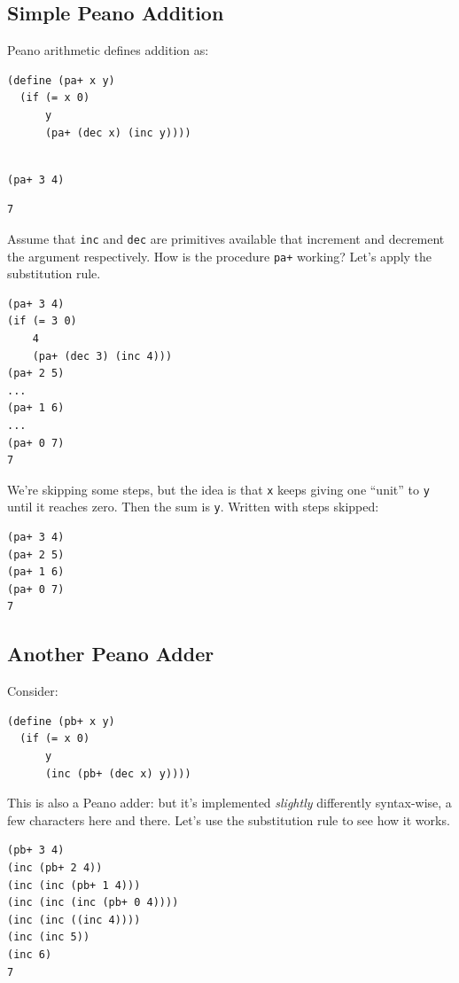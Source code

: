 \documentclass[9pt]{report}
\begin{document}
\subsection{Simple Peano Addition}
\label{sec:orgf3413b8}
Peano arithmetic defines addition as:

\begin{verbatim}
(define (pa+ x y)
  (if (= x 0)
      y
      (pa+ (dec x) (inc y))))
\end{verbatim}

\begin{verbatim}

(pa+ 3 4)
\end{verbatim}

\begin{verbatim}
7
\end{verbatim}


Assume that \texttt{inc} and \texttt{dec} are primitives available that increment
and decrement the argument respectively. How is the procedure \texttt{pa+}
working? Let's apply the substitution rule.

\begin{verbatim}
(pa+ 3 4)
(if (= 3 0)
    4
    (pa+ (dec 3) (inc 4)))
(pa+ 2 5)
...
(pa+ 1 6)
...
(pa+ 0 7)
7
\end{verbatim}

We're skipping some steps, but the idea is that \texttt{x} keeps giving
one ``unit'' to \texttt{y} until it reaches zero. Then the sum is \texttt{y}.
Written with steps skipped:

\begin{verbatim}
(pa+ 3 4)
(pa+ 2 5)
(pa+ 1 6)
(pa+ 0 7)
7
\end{verbatim}

\subsection{Another Peano Adder}
\label{sec:orgf6f2cb1}
Consider:
\begin{verbatim}
(define (pb+ x y)
  (if (= x 0)
      y
      (inc (pb+ (dec x) y))))
\end{verbatim}


This is also a Peano adder: but it's implemented \emph{slightly}
differently syntax-wise, a few characters here and there. Let's
use the substitution rule to see how it works.

\begin{verbatim}
(pb+ 3 4)
(inc (pb+ 2 4))
(inc (inc (pb+ 1 4)))
(inc (inc (inc (pb+ 0 4))))
(inc (inc ((inc 4))))
(inc (inc 5))
(inc 6)
7
\end{verbatim}
\end{document}
